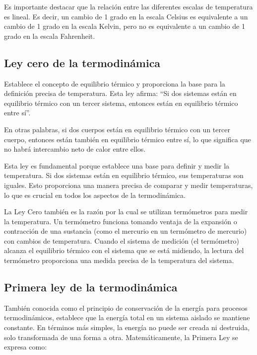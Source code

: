 \documentclass[letterpaper, 12pt]{article}
\begin{document}
Es importante destacar que la relación entre las diferentes
escalas de temperatura es lineal. Es decir, un cambio de 1
grado en la escala Celsius es equivalente a un cambio de 1
grado en la escala Kelvin, pero no es equivalente a un
cambio de 1 grado en la escala Fahrenheit.

\subsection{Ley cero de la termodinámica~\cite{Fernández}}

Establece el concepto de equilibrio térmico y proporciona
la base para la definición precisa de temperatura. Esta ley
afirma: ``Si dos sistemas están en equilibrio térmico con
un tercer sistema, entonces están en equilibrio térmico
entre sí''.

En otras palabras, si dos cuerpos están en equilibrio
térmico con un tercer cuerpo, entonces están también en
equilibrio térmico entre sí, lo que significa que no habrá
intercambio neto de calor entre ellos.

Esta ley es fundamental porque establece una base para
definir y medir la temperatura. Si dos sistemas están en
equilibrio térmico, sus temperaturas son iguales. Esto
proporciona una manera precisa de comparar y medir
temperaturas, lo que es crucial en todos los aspectos de la
termodinámica.

La Ley Cero también es la razón por la cual se utilizan
termómetros para medir la temperatura. Un termómetro
funciona tomando ventaja de la expansión o contracción de
una sustancia (como el mercurio en un termómetro de
mercurio) con cambios de temperatura. Cuando el sistema de
medición (el termómetro) alcanza el equilibrio térmico con
el sistema que se está midiendo, la lectura del termómetro
proporciona una medida precisa de la temperatura del
sistema.

\subsection{Primera ley de la termodinámica~\cite{Tomé_2018}}

También conocida como el principio de conservación de la
energía para procesos termodinámicos, establece que la
energía total en un sistema aislado se mantiene constante.
En términos más simples, la energía no puede ser creada ni
destruida, solo transformada de una forma a otra.
Matemáticamente, la Primera Ley se expresa como:
\end{document}
